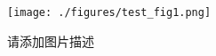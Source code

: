 
\begin{figure}[ht]
\centering
\texttt{[image: ./figures/test\_fig1.png]}
\caption{请添加图片描述} \label{test_fig1}
\end{figure}
